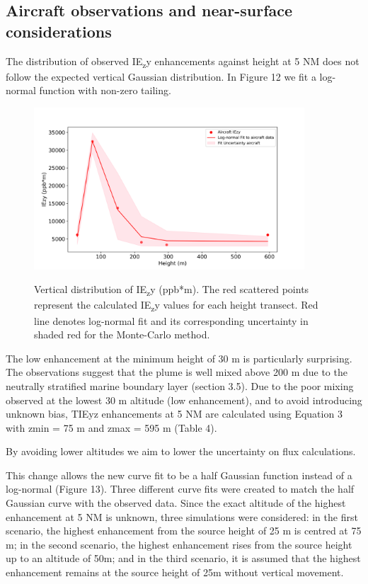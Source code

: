 \documentclass[12pt]{article}
\begin{document}
\subsection{Aircraft observations and near-surface considerations}
The distribution of observed IE\textsubscript{z}y enhancements against height  at 5 NM does not follow the expected vertical Gaussian distribution.  In Figure 12 we fit a log-normal function with non-zero tailing.


\begin{figure}[H]
\centering
\includegraphics[width=0.9\textwidth]{Plots/faam_IEZY.png}
\caption{\label{fig:volume source}} Vertical distribution of IE\textsubscript{z}y
(ppb*m). The red scattered points represent the calculated IE\textsubscript{z}y values for each height transect. Red line denotes log-normal fit and its corresponding uncertainty in shaded red for the Monte-Carlo method.  
\end{figure}

The low enhancement at the minimum height of 30 m is particularly surprising. The observations suggest that the plume is well mixed above 200 m due to the neutrally stratified marine boundary layer (section 3.5). Due to the poor mixing observed at the lowest 30 m altitude (low enhancement), and to avoid introducing unknown bias, TIEyz enhancements at 5 NM are calculated using Equation 3 with zmin = 75 m and zmax = 595 m (Table 4). 

By avoiding lower altitudes we aim to lower the uncertainty on flux calculations.
 
This change allows the new curve fit to be a half Gaussian function instead of a log-normal (Figure 13). Three different curve fits were created  to match the half Gaussian curve with the observed data. Since the exact altitude of the highest enhancement at 5 NM is unknown, three simulations were considered: in the first scenario, the highest enhancement from the source height of 25 m is centred at 75 m; in the second scenario, the highest enhancement rises from the source height up to an altitude of 50m; and in the third scenario, it is assumed that the highest enhancement remains at the source height of 25m without vertical movement.
\end{document}
